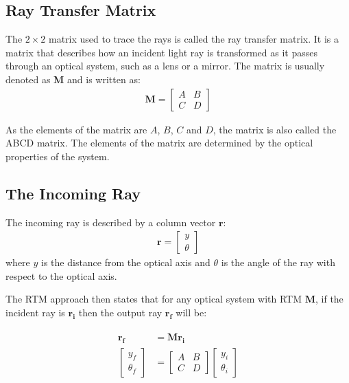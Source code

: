 \documentclass[12pt]{article}
\begin{document}
\subsection{Ray Transfer Matrix}
The \(2\times 2\) matrix used to trace the rays is called the ray transfer matrix. It is a matrix that describes how an incident light ray is transformed as it passes through an optical system, such as a lens or a mirror. The matrix is usually denoted as \(\mathbf{M}\) and is written as:
\begin{align}
    \label{eq:rtm}
    \mathbf{M} = \begin{bmatrix}
                     A & B \\
                     C & D
                 \end{bmatrix}
\end{align}

As the elements of the matrix are \(A\), \(B\), \(C\) and \(D\), the matrix is also called the ABCD matrix. The elements of the matrix are determined by the optical properties of the system.

\subsection{The Incoming Ray}
The incoming ray is described by a column vector \(\mathbf{r}\):
\begin{align}
    \label{eq:incoming}
    \mathbf{r} = \begin{bmatrix}
                     y \\
                     \theta
                 \end{bmatrix}
\end{align}
where \(y\) is the distance from the optical axis and \(\theta\) is the angle of the ray with respect to the optical axis.

The RTM approach then states that for any optical system with RTM \(\mathbf{M}\), if the incident ray is \(\mathbf{r_i}\) then the output ray \(\mathbf{r_f}\) will be:

\begin{align}
    \label{eq:rtm-transformation}
    \begin{split}
        \mathbf{r_f}    & =\mathbf{M}\mathbf{r_i}      \\
        \begin{bmatrix}
            y_f \\
            \theta_f
        \end{bmatrix} & = \begin{bmatrix}
            A & B \\
            C & D
        \end{bmatrix} \begin{bmatrix}
            y_i \\
            \theta_i
        \end{bmatrix}\end{split}
\end{align}
\end{document}
